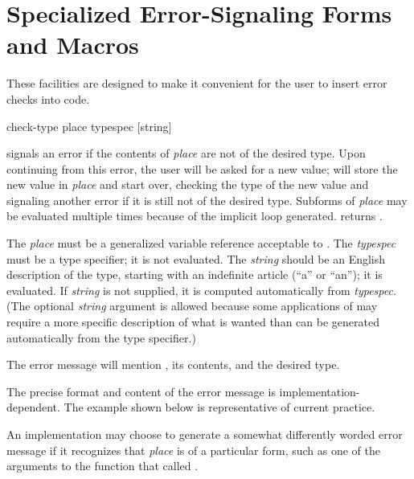 \section{Specialized Error-Signaling Forms and Macros}
\label{SPECIALIZED-ERROR-SIGNALLING}

These facilities are designed to make it convenient for the user
to insert error checks into code.

\begin{defmac}
check-type place typespec [string]

\begin{obsolete}\noindent
{} signals an error if the contents of \emph{place} are not
of the desired type.
Upon continuing from this error, the user will be asked for a new value;
 will store the new value in \emph{place} and start over, 
checking the type of the new value and signaling
another error if it is still not of the desired type.  Subforms of
\emph{place} may be evaluated multiple times because of the implicit
loop generated.   returns {\false}.

The \emph{place} must be a generalized variable reference acceptable to
.
The \emph{typespec} must be a type specifier; it is not evaluated.
The \emph{string} should be an English description of the type, starting with
an indefinite article (``a'' or ``an''); it is evaluated.
If \emph{string} is
not supplied, it is computed automatically from \emph{typespec}.
(The optional \emph{string} argument is allowed because some applications
of  may require a more specific description of what is
wanted than can be generated automatically from the type specifier.)

The error message will mention , its contents, and the desired type.
\end{obsolete}

\begin{newer}
The precise format and content of the error message
is implementation-dependent.  The example shown below
is representative of current practice.
\end{newer}

\beforenoterule
\begin{implementation}
An implementation may choose to
generate a somewhat differently worded
error message if it recognizes that \emph{place} is of a particular
form, such as one of the arguments to
the function that called .
\end{implementation}
\afternoterule


\end{defmac}
